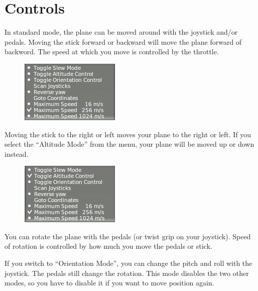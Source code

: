 \documentclass[a4paper,12pt]{article}
\begin{document}
\vspace{1cm}
\section*{\Huge{\textbf{Controls}}}
\vspace{1cm}


In standard mode, the plane can be moved around with the joystick
and/or pedals. Moving the stick forward or backward will move the
plane forward of backword. The speed at which you move is controlled
by the throttle.

\begin{figure}[h!]%
\centering
\includegraphics[scale=1]{slewstandard.png}
\label{fig:infowindow}
\end{figure}

\vspace{0.5\baselineskip}
Moving the stick to the right or left moves your plane to the right or
left. If you select the ``Altitude Mode'' from the menu, your plane
will be moved up or down instead. 

\begin{figure}[h!]%
\centering
\includegraphics[scale=1]{slewaltitude.png}
\label{fig:infowindow}
\end{figure}

\vspace{0.5\baselineskip}
You can rotate the plane with the pedals (or twist grip on your
joystick). Speed of rotation is controlled by how much you move the
pedals or stick.

\vspace{0.5\baselineskip}
If you switch to ``Orientation Mode'', you can change the pitch and
roll with the joystick. The pedals still change the rotation. This
mode disables the two other modes, so you have to disable it if you
want to move position again.
\end{document}
